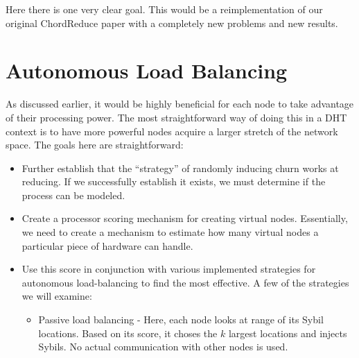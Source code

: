 Here there is one very clear goal.
This would be a reimplementation of our original ChordReduce paper with a completely new problems and new results.



\section{Autonomous Load Balancing}
As discussed earlier, it would be highly beneficial for each node to take advantage of their processing power.
The most straightforward way of doing this in a DHT context is to have more powerful nodes acquire a larger stretch of the network space.
The goals here are straightforward:

\begin{itemize}
	\item Further establish that the ``strategy'' of randomly inducing churn works at reducing.
	If we successfully establish it exists,  we must determine if the process can be modeled.%
	\item Create a processor scoring mechanism for creating virtual nodes.  
	Essentially, we need to create a mechanism to estimate how many virtual nodes a particular piece of hardware can handle.
	\item Use this score in conjunction with various implemented strategies for autonomous load-balancing to find the most effective.
	A few of the strategies we will examine:
	\begin{itemize}
		\item Passive load balancing -  Here, each node looks at range of its Sybil locations.
		Based on its score, it choses the $k$ largest locations and injects Sybils.
		No actual communication with other nodes is used.

\end{itemize}
\end{itemize}
